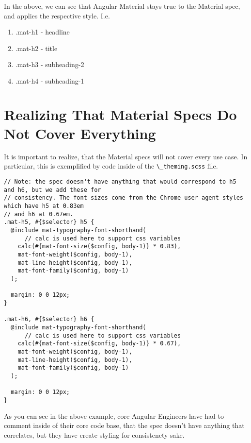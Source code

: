 In the above, we can see that Angular Material stays true to the Material
spec, and applies the respective style. I.e. 
\begin{enumerate}
  \item .mat-h1 - headline
  \item .mat-h2 - title
  \item .mat-h3 - subheading-2
  \item .mat-h4 - subheading-1
\end{enumerate}

\section{Realizing That Material Specs Do Not Cover Everything}
It is important to realize, that the Material specs will not cover
every use case. In particular, this is exemplified by code inside of 
the \lstinline{\_theming.scss} file. 

\begin{lstlisting}
// Note: the spec doesn't have anything that would correspond to h5 and h6, but we add these for
// consistency. The font sizes come from the Chrome user agent styles which have h5 at 0.83em
// and h6 at 0.67em.
.mat-h5, #{$selector} h5 {
  @include mat-typography-font-shorthand(
      // calc is used here to support css variables
    calc(#{mat-font-size($config, body-1)} * 0.83),
    mat-font-weight($config, body-1),
    mat-line-height($config, body-1),
    mat-font-family($config, body-1)
  );

  margin: 0 0 12px;
}

.mat-h6, #{$selector} h6 {
  @include mat-typography-font-shorthand(
      // calc is used here to support css variables
    calc(#{mat-font-size($config, body-1)} * 0.67),
    mat-font-weight($config, body-1),
    mat-line-height($config, body-1),
    mat-font-family($config, body-1)
  );

  margin: 0 0 12px;
}
\end{lstlisting}

As you can see in the above example, core Angular Engineers have had to comment 
inside of their core code base, that the spec doesn't have anything that 
correlates, but they have create styling for consistencty sake. 
